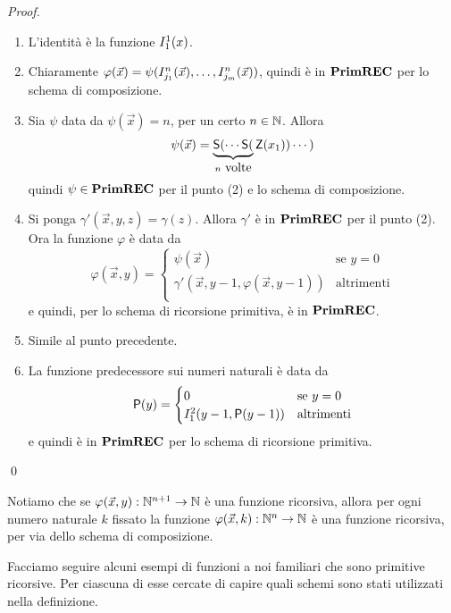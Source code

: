 \documentclass[runningheads,a4paper]{llncs}
\begin{document}
\begin{proof}
\begin{enumerate}[label=(\roman*)]
\item L'identit\`{a} \`{e} la funzione $I_{1}^{1}(x)$.
\item Chiaramente $\varphi(\vec x) = \psi(I_{j_1}^{n}(\vec x),\ldots,I_{j_m}^{n}(\vec x))$, quindi \`{e} in $\mathbf{PrimREC}$ per lo schema di composizione.
\item Sia $\psi$ data da $\psi(\vec x) = n$, per un certo $n \in \mathbb{N}$. Allora 
$$\psi(\vec x) = \underbrace{\mathsf{S}(\cdots\mathsf{S}(}_{n\mbox{ volte}}\mathsf{Z}(x_1))\cdots)$$
quindi $\psi \in \mathbf{PrimREC}$ per il punto (2) e lo schema di composizione.
\item Si ponga $\gamma'(\vec x,y,z) = \gamma(z)$. Allora $\gamma'$ \`{e} in $\mathbf{PrimREC}$ per il punto (2). Ora la funzione $\varphi$ \`{e} data da 
$$
\varphi(\vec x,y) = 
\begin{cases}
\psi(\vec x) & \mbox{se } y = 0 \\
\gamma'(\vec x,y-1,\varphi(\vec x,y-1)) & \mbox{altrimenti} \\
\end{cases}
$$
e quindi, per lo schema di ricorsione primitiva, \`{e} in $\mathbf{PrimREC}$.
\item Simile al punto precedente.
\item La funzione predecessore sui numeri naturali \`{e} data da 
$$
\mathsf{P}(y) = 
\begin{cases}
0 & \mbox{se } y = 0 \\
I_{1}^{2}(y-1,\mathsf{P}(y-1)) & \mbox{altrimenti} \\
\end{cases}
$$
e quindi \`{e} in $\mathbf{PrimREC}$ per lo schema di ricorsione primitiva.
\end{enumerate}
\qed\end{proof}

Notiamo che se $\varphi(\vec x,y): \mathbb{N}^{n+1} \to \mathbb{N}$ \`{e} una funzione ricorsiva, allora per ogni numero naturale $k$ fissato la funzione $\varphi(\vec x,k): \mathbb{N}^n \to \mathbb{N}$ \`{e} una funzione ricorsiva, per via dello schema di composizione.

Facciamo seguire alcuni esempi di funzioni a noi familiari che sono primitive ricorsive. Per ciascuna di esse cercate di capire quali schemi sono stati utilizzati nella definizione. 
\end{document}
